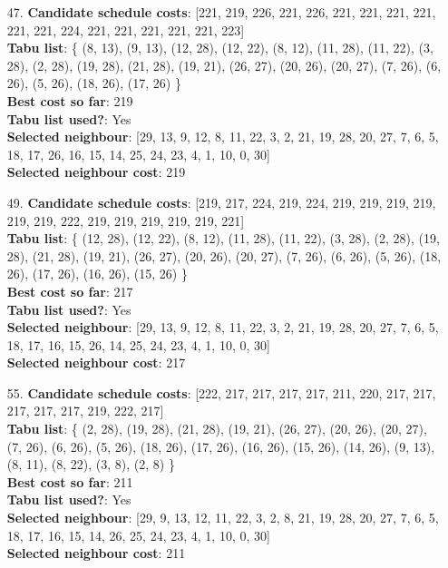 \documentclass[fleqn]{article}
\begin{document}
\begin{itemize}
    \item[47.] \textbf{Candidate schedule costs}: [221, 219, 226, 221, 226, 221, 221, 221, 221, 221, 221, 224, 221, 221, 221, 221, 221, 223] \\
    \textbf{Tabu list}: \{ (8, 13), (9, 13), (12, 28), (12, 22), (8, 12), (11, 28), (11, 22), (3, 28), (2, 28), (19, 28), (21, 28), (19, 21), (26, 27), (20, 26), (20, 27), (7, 26), (6, 26), (5, 26), (18, 26), (17, 26) \} \\
    \textbf{Best cost so far}: 219 \\
    \textbf{Tabu list used?}: Yes \\
    \textbf{Selected neighbour}: [29, 13, 9, 12, 8, 11, 22, 3, 2, 21, 19, 28, 20, 27, 7, 6, 5, 18, 17, 26, 16, 15, 14, 25, 24, 23, 4, 1, 10, 0, 30] \\
    \textbf{Selected neighbour cost}: 219
      

    \item[49.] \textbf{Candidate schedule costs}: [219, 217, 224, 219, 224, 219, 219, 219, 219, 219, 219, 222, 219, 219, 219, 219, 219, 221] \\
    \textbf{Tabu list}: \{ (12, 28), (12, 22), (8, 12), (11, 28), (11, 22), (3, 28), (2, 28), (19, 28), (21, 28), (19, 21), (26, 27), (20, 26), (20, 27), (7, 26), (6, 26), (5, 26), (18, 26), (17, 26), (16, 26), (15, 26) \} \\
    \textbf{Best cost so far}: 217 \\
    \textbf{Tabu list used?}: Yes \\
    \textbf{Selected neighbour}: [29, 13, 9, 12, 8, 11, 22, 3, 2, 21, 19, 28, 20, 27, 7, 6, 5, 18, 17, 16, 15, 26, 14, 25, 24, 23, 4, 1, 10, 0, 30] \\
    \textbf{Selected neighbour cost}: 217
      

    \item[55.] \textbf{Candidate schedule costs}: [222, 217, 217, 217, 217, 211, 220, 217, 217, 217, 217, 217, 219, 222, 217] \\
    \textbf{Tabu list}: \{ (2, 28), (19, 28), (21, 28), (19, 21), (26, 27), (20, 26), (20, 27), (7, 26), (6, 26), (5, 26), (18, 26), (17, 26), (16, 26), (15, 26), (14, 26), (9, 13), (8, 11), (8, 22), (3, 8), (2, 8) \} \\
    \textbf{Best cost so far}: 211 \\
    \textbf{Tabu list used?}: Yes \\
    \textbf{Selected neighbour}: [29, 9, 13, 12, 11, 22, 3, 2, 8, 21, 19, 28, 20, 27, 7, 6, 5, 18, 17, 16, 15, 14, 26, 25, 24, 23, 4, 1, 10, 0, 30] \\
    \textbf{Selected neighbour cost}: 211
      


\end{itemize}
\end{document}
